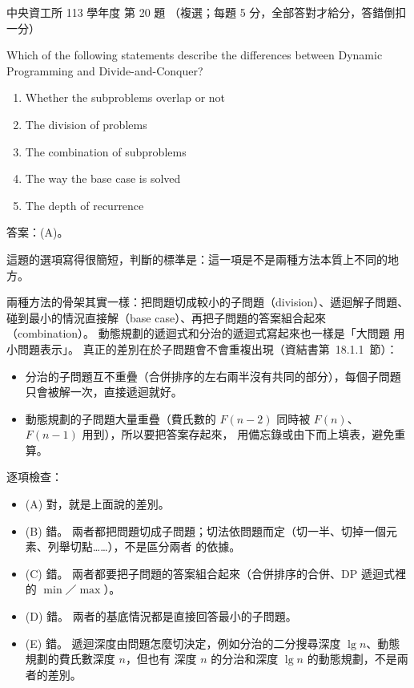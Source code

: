 \begin{pastexam}[label={px:ncu-113-dsa-20}]{中央資工所 113 學年度 第 20 題}
（複選；每題 5 分，全部答對才給分，答錯倒扣一分）

Which of the following statements describe the differences between Dynamic Programming and
Divide-and-Conquer?
\begin{enumerate}[label=(\Alph*)]
\item Whether the subproblems overlap or not
\item The division of problems
\item The combination of subproblems
\item The way the base case is solved
\item The depth of recurrence
\end{enumerate}
\end{pastexam}

\begin{pastsoln}
答案：(A)。

這題的選項寫得很簡短，判斷的標準是：這一項是不是兩種方法本質上不同的地方。

兩種方法的骨架其實一樣：把問題切成較小的子問題（division）、遞迴解子問題、碰到最小的情況直接解（base
case）、再把子問題的答案組合起來（combination）。 動態規劃的遞迴式和分治的遞迴式寫起來也一樣是「大問題
用小問題表示」。 真正的差別在於子問題會不會重複出現（資結書第~18.1.1~節）：
\begin{itemize}
\item 分治的子問題互不重疊（合併排序的左右兩半沒有共同的部分），每個子問題只會被解一次，直接遞迴就好。
\item 動態規劃的子問題大量重疊（費氏數的 $F(n-2)$ 同時被 $F(n)$、$F(n-1)$ 用到），所以要把答案存起來，
用備忘錄或由下而上填表，避免重算。
\end{itemize}

逐項檢查：
\begin{itemize}
\item (A) 對，就是上面說的差別。
\item (B) 錯。 兩者都把問題切成子問題；切法依問題而定（切一半、切掉一個元素、列舉切點……），不是區分兩者
的依據。
\item (C) 錯。 兩者都要把子問題的答案組合起來（合併排序的合併、DP 遞迴式裡的 $\min$／$\max$）。
\item (D) 錯。 兩者的基底情況都是直接回答最小的子問題。
\item (E) 錯。 遞迴深度由問題怎麼切決定，例如分治的二分搜尋深度 $\lg n$、動態規劃的費氏數深度 $n$，但也有
深度 $n$ 的分治和深度 $\lg n$ 的動態規劃，不是兩者的差別。
\end{itemize}
\end{pastsoln}
